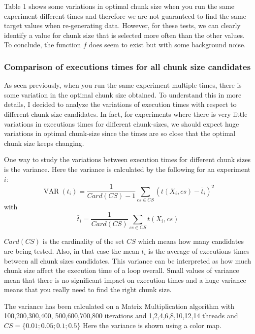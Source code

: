 Table 1 shows some variations in optimal chunk size when you run the same experiment different times and therefore we are not guaranteed to find the same target values when re-generating data. However, for these tests, we can clearly identify a value for chunk size that is selected more often than the other values. To conclude, the function $f$ does seem to exist but with some background noise.

\subsubsection{Comparison of executions times for all chunk size candidates}
As seen previously, when you run the same experiment multiple times, there is some variation in the optimal chunk size obtained. To understand this in more details, I decided to analyze the variations of execution times with respect to different chunk size candidates.
 In fact, for experiments where there is very little variations in executions times for different chunk-sizes, we should expect huge variations in optimal chunk-size since the times are so close that the optimal chunk size keeps changing.

One way to study the variations between execution times for different chunk sizes is the variance. Here the variance is calculated by the following for an experiment $i$:
$$\operatorname{VAR}(t_i)=\frac{1}{Card(CS)-1}\sum_{cs \in CS}(t(X_i,cs)-\bar{t}_i)^2$$
with 
$$\bar{t}_i=\frac{1}{Card(CS)}\sum_{cs \in CS}t(X_i,cs)$$

 $Card(CS)$ is the cardinality of the set $CS$ which means how many candidates are being tested. Also, in that case the mean $\bar{t}_i$ is the average of executions times between all chunk sizes candidates. This variance can be interpreted as how much chunk size affect the execution time of a loop overall. Small values of variance mean that there is no significant impact on execution times and a huge variance means that you really need to find the right chunk size.

The variance has been calculated on a Matrix Multiplication algorithm with 100,200,300,400, 500,600,700,800 iterations and 1,2,4,6,8,10,12,14 threads and $CS=\{0.01;0.05;0.1;0.5\}$
Here the variance is shown using a color map.

